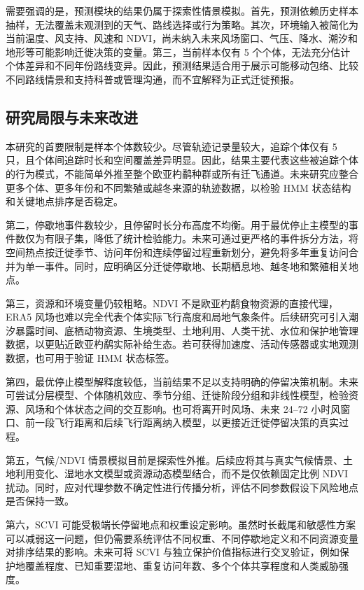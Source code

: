 \documentclass[UTF8,a4paper,12pt]{ctexart}
\begin{document}
需要强调的是，预测模块的结果仍属于探索性情景模拟。首先，预测依赖历史样本抽样，无法覆盖未观测到的天气、路线选择或行为策略。其次，环境输入被简化为当前温度、风支持、风速和 NDVI，尚未纳入未来风场窗口、气压、降水、潮汐和地形等可能影响迁徙决策的变量。第三，当前样本仅有 5 个个体，无法充分估计个体差异和不同年份路线变异。因此，预测结果适合用于展示可能移动包络、比较不同路线情景和支持科普或管理沟通，而不宜解释为正式迁徙预报。

\subsection{研究局限与未来改进}

本研究的首要限制是样本个体数较少。尽管轨迹记录量较大，追踪个体仅有 5 只，且个体间追踪时长和空间覆盖差异明显。因此，结果主要代表这些被追踪个体的行为模式，不能简单外推至整个欧亚杓鹬种群或所有迁飞通道。未来研究应整合更多个体、更多年份和不同繁殖或越冬来源的轨迹数据，以检验 HMM 状态结构和关键地点排序是否稳定。

第二，停歇地事件数较少，且停留时长分布高度不均衡。用于最优停止主模型的事件数仅为有限子集，降低了统计检验能力。未来可通过更严格的事件拆分方法，将空间热点按迁徙季节、访问年份和连续停留过程重新划分，避免将多年重复访问合并为单一事件。同时，应明确区分迁徙停歇地、长期栖息地、越冬地和繁殖相关地点。

第三，资源和环境变量仍较粗略。NDVI 不是欧亚杓鹬食物资源的直接代理，ERA5 风场也难以完全代表个体实际飞行高度和局地气象条件。后续研究可引入潮汐暴露时间、底栖动物资源、生境类型、土地利用、人类干扰、水位和保护地管理数据，以更贴近欧亚杓鹬实际补给生态。若可获得加速度、活动传感器或实地观测数据，也可用于验证 HMM 状态标签。

第四，最优停止模型解释度较低，当前结果不足以支持明确的停留决策机制。未来可尝试分层模型、个体随机效应、季节分组、迁徙阶段分组和非线性模型，检验资源、风场和个体状态之间的交互影响。也可将离开时风场、未来 24--72 小时风窗口、前一段飞行距离和后续飞行距离纳入模型，以更接近迁徙停留决策的真实过程。

第五，气候/NDVI 情景模拟目前是探索性外推。后续应将其与真实气候情景、土地利用变化、湿地水文模型或资源动态模型结合，而不是仅依赖固定比例 NDVI 扰动。同时，应对代理参数不确定性进行传播分析，评估不同参数假设下风险地点是否保持一致。

第六，SCVI 可能受极端长停留地点和权重设定影响。虽然时长截尾和敏感性方案可以减弱这一问题，但仍需要系统评估不同权重、不同停歇地定义和不同资源变量对排序结果的影响。未来可将 SCVI 与独立保护价值指标进行交叉验证，例如保护地覆盖程度、已知重要湿地、重复访问年数、多个个体共享程度和人类威胁强度。
\end{document}

